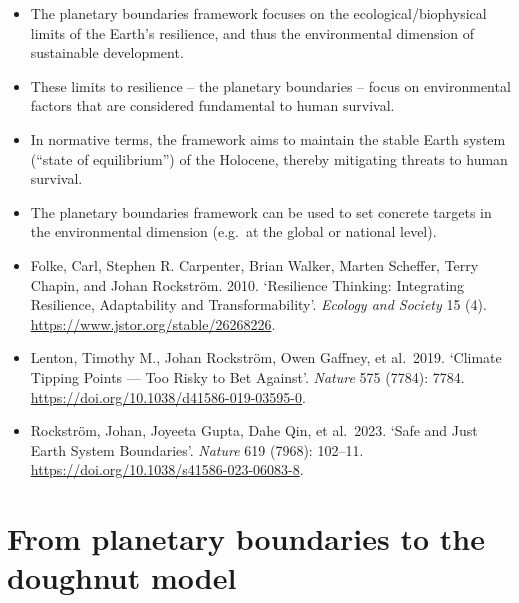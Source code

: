 \documentclass[
  a4paper,
  DIV=11,
  numbers=noendperiod,
  oneside,
  openany]{scrreprt}
\begin{document}
\begin{itemize}
\item
  The planetary boundaries framework focuses on the
  ecological/biophysical limits of the Earth's resilience, and thus the
  environmental dimension of sustainable development.
\item
  These limits to resilience -- the planetary boundaries -- focus on
  environmental factors that are considered fundamental to human
  survival.
\item
  In normative terms, the framework aims to maintain the stable Earth
  system (``state of equilibrium'') of the Holocene, thereby mitigating
  threats to human survival.
\item
  The planetary boundaries framework can be used to set concrete targets
  in the environmental dimension (e.g.~at the global or national level).
\end{itemize}

\begin{tcolorbox}[enhanced jigsaw, arc=.35mm, bottomrule=.15mm, bottomtitle=1mm, breakable, colback=white, colbacktitle=quarto-callout-caution-color!10!white, colframe=quarto-callout-caution-color-frame, coltitle=black, left=2mm, leftrule=.75mm, opacityback=0, opacitybacktitle=0.6, rightrule=.15mm, title={Further readings}, titlerule=0mm, toprule=.15mm, toptitle=1mm]

\begin{itemize}
\item
  Folke, Carl, Stephen R. Carpenter, Brian Walker, Marten Scheffer,
  Terry Chapin, and Johan Rockström. 2010. `Resilience Thinking:
  Integrating Resilience, Adaptability and Transformability'.
  \emph{Ecology and Society} 15 (4).
  \url{https://www.jstor.org/stable/26268226}.
\item
  Lenton, Timothy M., Johan Rockström, Owen Gaffney, et al.~2019.
  `Climate Tipping Points --- Too Risky to Bet Against'. \emph{Nature}
  575 (7784): 7784. \url{https://doi.org/10.1038/d41586-019-03595-0}.
\item
  Rockström, Johan, Joyeeta Gupta, Dahe Qin, et al.~2023. `Safe and Just
  Earth System Boundaries'. \emph{Nature} 619 (7968): 102--11.
  \url{https://doi.org/10.1038/s41586-023-06083-8}.
\end{itemize}

\end{tcolorbox}

\section{From planetary boundaries to the doughnut
model}\label{from-planetary-boundaries-to-the-doughnut-model}
\end{document}
